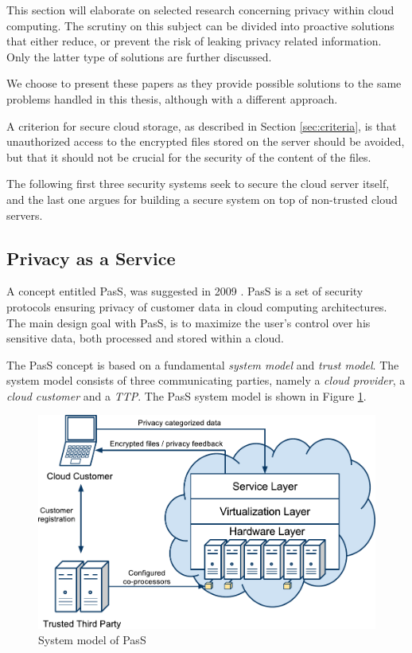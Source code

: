 \documentclass[pdftex,english,10pt,b5paper,twoside]{book}
\begin{document}
This section will elaborate on selected research concerning privacy
within cloud computing. The scrutiny on this subject can be divided into
proactive solutions that either reduce, or prevent the risk of leaking privacy
related information. Only the latter type of solutions are further discussed.

We choose to present these papers as they provide possible solutions to the
same problems handled in this thesis, although with a different approach.  

A
criterion for secure cloud storage, as described in Section \ref{sec:criteria},
is that unauthorized access to the encrypted files stored on the server should
be avoided, but that it should not be crucial for the security of the content
of the files. 


The following first three security systems seek to secure the cloud server
itself, and the last one argues for building a secure system on top of
non-trusted cloud servers.

\subsection{Privacy as a Service}

A concept entitled \ac{PasS}, was suggested in 2009 \cite{PasS}. \ac{PasS} is a
set of security protocols ensuring privacy of customer data in cloud computing
architectures. The main design goal with \ac{PasS}, is to maximize the user's
control over his sensitive data, both processed and stored within a cloud.

The \ac{PasS} concept is based on a fundamental \emph{system model} and
\emph{trust model}. The system model consists of three communicating parties,
namely a \emph{cloud provider}, a \emph{cloud customer} and a \emph{\ac{TTP}}.
The \ac{PasS} system model is shown in Figure \ref{fig:RW:PasS}.

\begin{figure}[h!]
    \centering
    \includegraphics[scale=0.6]{ArchitecturePasS.pdf}
    \caption{System model of PasS}
    \label{fig:RW:PasS}
\end{figure}
\end{document}
